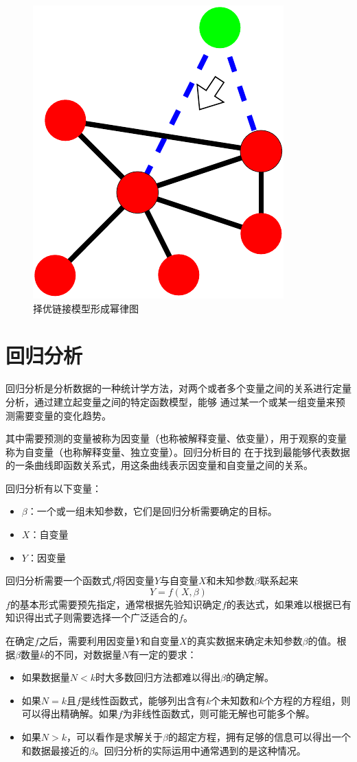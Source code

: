 \documentclass[master]{thesis-uestc}
\begin{document}
\begin{figure}
    \includegraphics[width=.5\linewidth]{pic/gen_powlaw.pdf}
    \caption{择优链接模型形成幂律图}
    \label{fig:gen-pow}

\end{figure}

\section{回归分析}
\label{sec:regression-analysis}

    回归分析是分析数据的一种统计学方法，对两个或者多个变量之间的关系进行定量分析，通过建立起变量之间的特定函数模型，能够
通过某一个或某一组变量来预测需要变量的变化趋势。

    其中需要预测的变量被称为因变量（也称被解释变量、依变量），用于观察的变量称为自变量（也称解释变量、独立变量）。回归分析目的
在于找到最能够代表数据的一条曲线即函数关系式，用这条曲线表示因变量和自变量之间的关系。

    回归分析有以下变量：
\begin{itemize}
    \item $\beta$：一个或一组未知参数，它们是回归分析需要确定的目标。
    \item $X$：自变量
    \item $Y$：因变量
\end{itemize}
    
    回归分析需要一个函数式$f$将因变量$Y$与自变量$X$和未知参数$\beta$联系起来
\begin{equation*}
    Y = f(X,\beta)
\end{equation*}
$f$的基本形式需要预先指定，通常根据先验知识确定$f$的表达式，如果难以根据已有知识得出式子则需要选择一个广泛适合的$f$。

    在确定$f$之后，需要利用因变量$Y$和自变量$X$的真实数据来确定未知参数$\beta$的值。根据$\beta$数量$k$的不同，对数据量$N$有一定的要求：
\begin{itemize}
    \item 如果数据量$N<k$时大多数回归方法都难以得出$\beta$的确定解。
    \item 如果$N=k$且$f$是线性函数式，能够列出含有$k$个未知数和$k$个方程的方程组，则可以得出精确解。如果$f$为非线性函数式，则可能无解也可能多个解。
    \item 如果$N>k$，可以看作是求解关于$\beta$的超定方程，拥有足够的信息可以得出一个和数据最接近的$\beta$。回归分析的实际运用中通常遇到的是这种情况。
\end{itemize}
\end{document}
